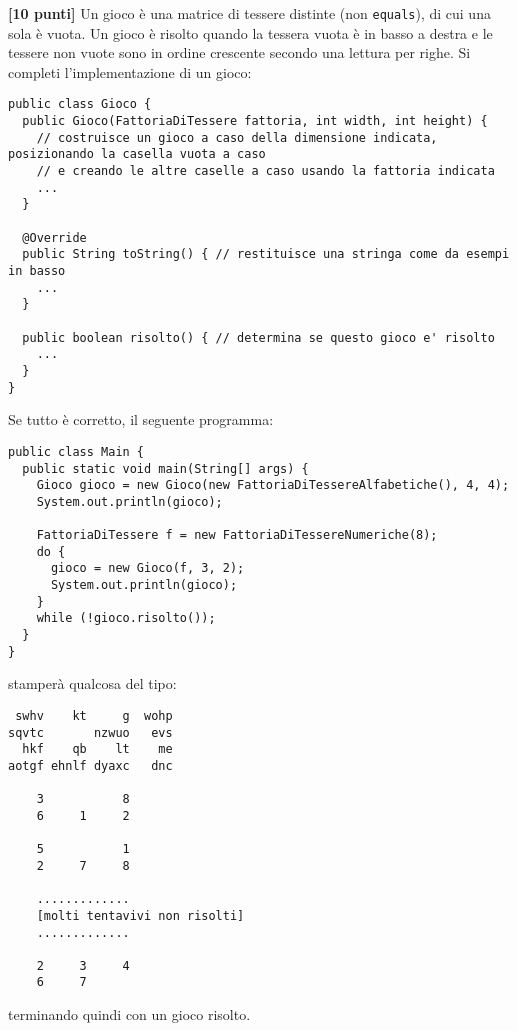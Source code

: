 \documentclass{article}[10pt]
\newcounter{esnu}
\newenvironment{esercizio}{\medskip \noindent {\bf Esercizio\addtocounter{esnu}{1} \arabic{esnu}}}{}
\begin{document}
\begin{esercizio}
\textbf{[10 punti]}
Un gioco \`e una matrice di tessere distinte (non \texttt{equals}), di cui una sola \`e
vuota. Un gioco
\`e risolto quando la tessera vuota \`e in basso a destra e le tessere non vuote
sono in ordine crescente secondo una lettura per righe.
Si completi l'implementazione di un gioco:
%
{\small
\begin{verbatim}
public class Gioco {
  public Gioco(FattoriaDiTessere fattoria, int width, int height) {
    // costruisce un gioco a caso della dimensione indicata, posizionando la casella vuota a caso
    // e creando le altre caselle a caso usando la fattoria indicata
    ...
  }

  @Override
  public String toString() { // restituisce una stringa come da esempi in basso
    ...
  }

  public boolean risolto() { // determina se questo gioco e' risolto
    ...
  }
}
\end{verbatim}
}

\end{esercizio}

Se tutto \`e corretto, il seguente programma:
%
{\small
\begin{verbatim}
public class Main {
  public static void main(String[] args) {
    Gioco gioco = new Gioco(new FattoriaDiTessereAlfabetiche(), 4, 4);
    System.out.println(gioco);

    FattoriaDiTessere f = new FattoriaDiTessereNumeriche(8);
    do {
      gioco = new Gioco(f, 3, 2);
      System.out.println(gioco);
    }
    while (!gioco.risolto());
  }
}
\end{verbatim}
}

\noindent
stamper\`a qualcosa del tipo:

{\small
\begin{verbatim}
 swhv    kt     g  wohp 
sqvtc       nzwuo   evs 
  hkf    qb    lt    me 
aotgf ehnlf dyaxc   dnc 

    3           8 
    6     1     2 

    5           1 
    2     7     8 

    .............
    [molti tentavivi non risolti]
    .............

    2     3     4 
    6     7       
\end{verbatim}
}

\noindent
terminando quindi con un gioco risolto.
\end{document}
